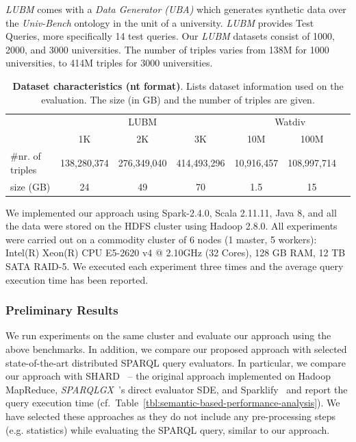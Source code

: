 \textit{LUBM} comes with a \textit{Data Generator (UBA)} which generates synthetic data over the \textit{Univ-Bench} ontology in the unit of a university. 
\textit{LUBM} provides Test Queries, more specifically 14 test queries.
Our \textit{LUBM} datasets consist of 1000, 2000, and 3000 universities.
The number of triples varies from 138M for 1000 universities, to 414M triples for 3000 universities.


\begin{table}
\centering
\begin{tabularx}{\textwidth}{Xcccccc}	
\toprule
\multirow{2}{*}{} & \multicolumn{3}{c|}{LUBM} & \multicolumn{3}{c}{Watdiv} \\
\cline{2-7}  \rule{0pt}{10pt}
&   \scriptsize{1K} & \scriptsize{2K} & \scriptsize{3K} & \scriptsize{10M} &\scriptsize{100M} &\\
\midrule
\scriptsize{\#nr. of triples}& \scriptsize{138,280,374} & \scriptsize{276,349,040} & \scriptsize{414,493,296}  &  \scriptsize{10,916,457} & \scriptsize{108,997,714} &  \\
\scriptsize{size (GB)}  & \scriptsize{24} & \scriptsize{49}  & \scriptsize{70} & \scriptsize{1.5} &\scriptsize{15} &\\
\bottomrule
\end{tabularx}
{\caption{\textbf{Dataset characteristics (nt format)}.
Lists dataset information used on the evaluation.
The size (in GB) and the number of triples are given.}
\label{tab:semantic-based-dataset_info}}
\end{table}

We implemented our approach using Spark-2.4.0, Scala 2.11.11, Java 8, and all the data were stored on the \gls{HDFS} cluster using Hadoop 2.8.0.
All experiments were carried out on a commodity cluster of 6 nodes (1 master, 5 workers): Intel(R) Xeon(R) CPU E5-2620 v4 @ 2.10GHz (32 Cores), 128 GB RAM, 12 TB SATA RAID-5.
We executed each experiment three times and the average query execution time has been reported.

\subsubsection{Preliminary Results}
We run experiments on the same cluster and evaluate our approach using the above benchmarks. 
In addition, we compare our proposed approach with selected state-of-the-art distributed \gls{SPARQL} query evaluators.
In particular, we compare our approach with SHARD~\cite{Rohloff2010SHARD} -- the original approach implemented on Hadoop MapReduce, \emph{SPARQLGX}~\cite{sparqlgx-iswc-2016}'s direct evaluator SDE, and Sparklify~\cite{2019-sansa-sparklify-iswc} and report the query execution time (cf.\ Table~\ref{tbl:semantic-based-performance-analysis}).
We have selected these approaches as they do not include any pre-processing steps (e.g. statistics) while evaluating the \gls{SPARQL} query, similar to our approach.

